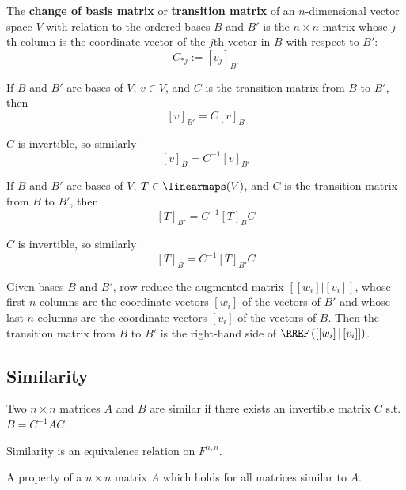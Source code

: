 \begin{definition}
  The \textbf{change of basis matrix} or \textbf{transition matrix} of an $n$-dimensional vector space $V$ with relation to the ordered bases $B$ and $B'$ is the $n \times n$ matrix whose $j$th column is the coordinate vector of the $j$th vector in $B$ with respect to $B'$:
  \[
    C_{*j} := [v_j]_{B'}
  \]
\end{definition}

\begin{lemma}
  If $B$ and $B'$ are bases of $V$, $v \in V$, and $C$ is the transition matrix from $B$ to $B'$, then
  \[
    [v]_{B'} = C [v]_{B}
  \]

  $C$ is invertible, so similarly
  \[
    [v]_{B} = C^{-1} [v]_{B'}
  \]
\end{lemma}

\begin{lemma}
  If $B$ and $B'$ are bases of $V$, $T \in \linearmaps(V)$, and $C$ is the transition matrix from $B$ to $B'$, then
  \[
    [T]_{B'} = C^{-1} [T]_B C
  \]

  $C$ is invertible, so similarly
  \[
    [T]_{B} = C^{-1} [T]_{B'} C
  \]
\end{lemma}

\begin{procedure}
  Given bases $B$ and $B'$, row-reduce the augmented matrix $\left[\left[w_i\right] | \left[v_i\right]\right]$, whose first $n$ columns are the coordinate vectors $\left[w_i\right]$ of the vectors of $B'$ and whose last $n$ columns are the coordinate vectors $\left[v_i\right]$ of the vectors of $B$. Then the transition matrix from $B$ to $B'$ is the right-hand side of $\RREF \left(\left[\left[w_i\right] | \left[v_i\right]\right] \right)$.
\end{procedure}

\subsection{Similarity}

\begin{definition}
  Two $n \times n$ matrices $A$ and $B$ are similar if there exists an invertible matrix $C$ s.t. $B = C^{-1} A C$.

  Similarity is an equivalence relation on $F^{n,n}$.
\end{definition}

\begin{definition}
  A property of a $n \times n$ matrix $A$ which holds for all matrices similar to $A$.
\end{definition}

